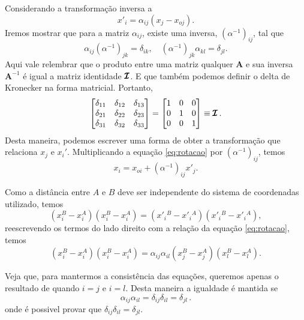 Considerando a transforma\c{c}\~ao inversa a
\begin{equation}
x'_{i}=\alpha_{ij}(x_{j}-x_{oj}).
  \label{eq:rotacao}
\end{equation}
Iremos mostrar que para a matriz $\alpha_{ij}$, existe uma inversa,
$(\alpha^{-1})_{ij}$, tal que
\begin{equation}
\alpha_{ij}(\alpha^{-1})_{jk}=\delta_{ik}, \quad (\alpha^{-1})_{jk}\alpha_{kl}=\delta_{jl}.
\label{eq:inversakronecker}
\end{equation}
Aqui vale relembrar que o produto entre uma matriz qualquer $\pmb{A}$ e sua inversa
$\pmb{A}^{-1}$ \'e igual a matriz identidade $\pmb{\cal{I}}$. E que tamb\'em
podemos definir o delta de Kronecker na forma matricial. Portanto,
\begin{equation}
  \begin{bmatrix}
    \delta_{11} & \delta_{12} & \delta_{13} \\
    \delta_{21} & \delta_{22} & \delta_{23} \\
    \delta_{31} & \delta_{32} & \delta_{33} 
  \end{bmatrix}=
  \begin{bmatrix}
    1 & 0 & 0 \\
    0 & 1 & 0 \\
    0 & 0 & 1 
  \end{bmatrix}
  \equiv \pmb{\cal{I}}
  \, .
\end{equation}
Desta maneira, podemos escrever uma forma de obter a transforma\c{c}\~ao que
relaciona $x_j$ e $x_i'$. Multiplicando a equa\c{c}\~ao \ref{eq:rotacao} por
$(\alpha^{-1})_{ij}$, temos
\begin{equation}
x_{i}=x_{oi}+(\alpha^{-1})_{ij}x'_{j}.
\end{equation}

Como a dist\^ancia entre $A$ e $B$ deve ser independente do
sistema de coordenadas utilizado, temos
\begin{equation}
 (x_{i}^{B}-x_{i}^{A})(x_{i}^{B}-x_{i}^{A})=(x'_i{}^{B}-x'_i{}^{A})(x'_i{}^{B}-x'_i{}^{A}),
\end{equation}
reescrevendo os termos do lado direito com a rela\c{c}\~ao da equa\c{c}\~ao \ref{eq:rotacao},
temos
\begin{equation}
 (x_{i}^{B}-x_{i}^{A})(x_{i}^{B}-x_{i}^{A})=\alpha_{ij}\alpha_{il}(x_{j}^{B}-x_{j}^{A})(x_{l}^{B}-x_{l}^{A}).
\end{equation}

Veja que, para mantermos a consist\^encia das equa\c{c}\~oes, 
queremos apenas o resultado de quando $i=j$ e $i=l$. Desta maneira
a igualdade \'e mantida se
\begin{equation}
  \alpha_{ij}\alpha_{il}=\delta_{ij}\delta_{il} = \delta_{jl} \, .
\end{equation}
onde \'e possivel provar que $\delta_{ij}\delta_{il} = \delta_{jl}$.

